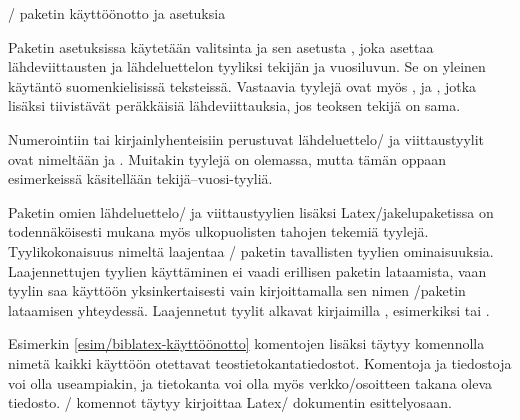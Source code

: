 \begin{esimerkki*}

\begin{koodilohko}
\usepackage{polyglossia}

\usepackage{csquotes}

\usepackage[style=authoryear]{biblatex}
\end{koodilohko}
  \caption{\-/ paketin käyttöönotto ja asetuksia}
  \label{esim/biblatex-käyttöönotto}
\end{esimerkki*}

Paketin asetuksissa käytetään valitsinta  ja sen asetusta
, joka asettaa lähdeviittausten ja lähdeluettelon
tyyliksi tekijän ja vuosiluvun. Se on yleinen käytäntö suomenkielisissä
teksteissä. Vastaavia tyylejä ovat myös ,
 ja , jotka lisäksi
tiivistävät peräkkäisiä lähdeviittauksia, jos teoksen tekijä on sama.

Numerointiin tai kirjainlyhenteisiin perustuvat lähdeluettelo\-/{} ja
viittaustyylit ovat nimeltään  ja
. Muitakin tyylejä on olemassa, mutta tämän
oppaan esimerkeissä käsitellään tekijä--vuosi-tyyliä.

Paketin omien lähdeluettelo\-/{} ja viittaustyylien lisäksi
Latex\-/jakelupaketissa on todennäköisesti mukana myös ulkopuolisten
tahojen tekemiä tyylejä. Tyylikokonaisuus nimeltä
 laajentaa \-/ paketin
tavallisten tyylien ominaisuuksia. Laajennettujen tyylien käyttäminen ei
vaadi erillisen paketin lataamista, vaan tyylin saa käyttöön
yksinkertaisesti vain kirjoittamalla sen nimen
\-/paketin lataamisen yhteydessä. Laajennetut tyylit
alkavat kirjaimilla \mbox{,} esimerkiksi
 tai .

Esimerkin \ref{esim/biblatex-käyttöönotto} komentojen lisäksi täytyy
komennolla  nimetä kaikki käyttöön otettavat
teostietokantatiedostot. Komentoja ja tiedostoja voi olla useampiakin,
ja tietokanta voi olla myös verkko\-/osoitteen takana oleva tiedosto.
\-/ komennot täytyy kirjoittaa Latex\-/
dokumentin esittelyosaan.

